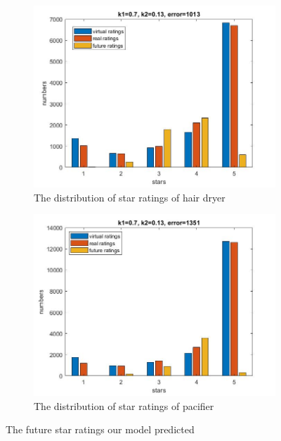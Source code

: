 \documentclass[12pt]{article}  %
\begin{document}
\begin{figure}[H]
  \centering
  \begin{subfigure}{.5\textwidth}
    \centering
    \includegraphics[width=\linewidth]{Q3picture/hair_dryer.jpg}
    \caption{The distribution of star ratings of hair dryer}
    \label{fig:}
  \end{subfigure}%
  \begin{subfigure}{.5\textwidth}
    \centering
    \includegraphics[width=\linewidth]{Q3picture/pacifier.jpg}
    \caption{The distribution of star ratings of pacifier}
    \label{fig:}
  \end{subfigure}
  \caption{The future star ratings our model predicted}
  \label{fig:}
\end{figure}
\end{document}
